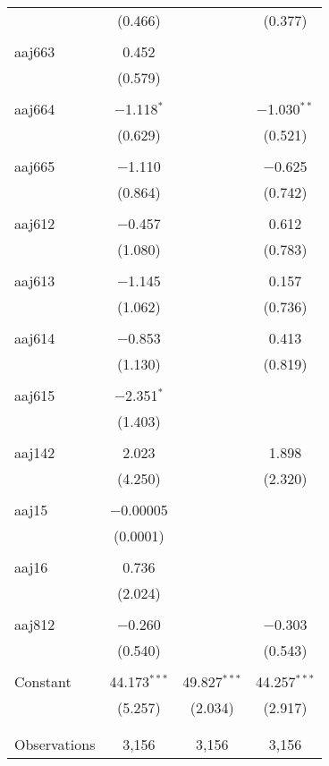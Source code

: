 \begin{table}[!htbp]
\begin{tabular}{@{\extracolsep{5pt}}lccc}
  & (0.466) &  & (0.377) \\ 
  & & & \\ 
 aaj663 & 0.452 &  &  \\ 
  & (0.579) &  &  \\ 
  & & & \\ 
 aaj664 & $-$1.118$^{*}$ &  & $-$1.030$^{**}$ \\ 
  & (0.629) &  & (0.521) \\ 
  & & & \\ 
 aaj665 & $-$1.110 &  & $-$0.625 \\ 
  & (0.864) &  & (0.742) \\ 
  & & & \\ 
 aaj612 & $-$0.457 &  & 0.612 \\ 
  & (1.080) &  & (0.783) \\ 
  & & & \\ 
 aaj613 & $-$1.145 &  & 0.157 \\ 
  & (1.062) &  & (0.736) \\ 
  & & & \\ 
 aaj614 & $-$0.853 &  & 0.413 \\ 
  & (1.130) &  & (0.819) \\ 
  & & & \\ 
 aaj615 & $-$2.351$^{*}$ &  &  \\ 
  & (1.403) &  &  \\ 
  & & & \\ 
 aaj142 & 2.023 &  & 1.898 \\ 
  & (4.250) &  & (2.320) \\ 
  & & & \\ 
 aaj15 & $-$0.00005 &  &  \\ 
  & (0.0001) &  &  \\ 
  & & & \\ 
 aaj16 & 0.736 &  &  \\ 
  & (2.024) &  &  \\ 
  & & & \\ 
 aaj812 & $-$0.260 &  & $-$0.303 \\ 
  & (0.540) &  & (0.543) \\ 
  & & & \\ 
 Constant & 44.173$^{***}$ & 49.827$^{***}$ & 44.257$^{***}$ \\ 
  & (5.257) & (2.034) & (2.917) \\ 
  & & & \\ 
\hline \\[-1.8ex] 
Observations & 3,156 & 3,156 & 3,156 \\ 

\end{tabular}
\end{table}
